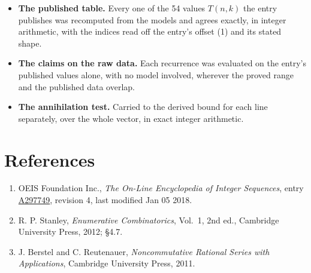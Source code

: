 \documentclass[11pt]{article}
\theoremstyle{definition}
\begin{document}
\begin{itemize}

\item {\bfseries The published table.} Every one of the 54 values $T(n,k)$ the entry publishes was recomputed from the models and agrees exactly, in integer arithmetic, with the indices read off the entry's offset (1) and its stated shape.

\item {\bfseries The claims on the raw data.} Each recurrence was evaluated on the entry's published values alone, with no model involved, wherever the proved range and the published data overlap.

\item {\bfseries The annihilation test.} Carried to the derived bound for each line separately, over the whole vector, in exact integer arithmetic.

\end{itemize}

\section{References}

\begin{enumerate}

\item OEIS Foundation Inc., \emph{The On-Line Encyclopedia of Integer Sequences}, entry \href{https://oeis.org/A297749}{A297749}, revision 4, last modified Jan 05 2018.

\item R. P. Stanley, \emph{Enumerative Combinatorics}, Vol.~1, 2nd ed., Cambridge University Press, 2012; \S4.7.

\item J. Berstel and C. Reutenauer, \emph{Noncommutative Rational Series with Applications}, Cambridge University Press, 2011.

\end{enumerate}
\end{document}
